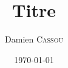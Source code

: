 \documentclass{article}
\title{Titre}
\author{Damien \textsc{Cassou}}
\date{\today{}}
\begin{document}
\maketitle{}

\sloppy
\end{document}
